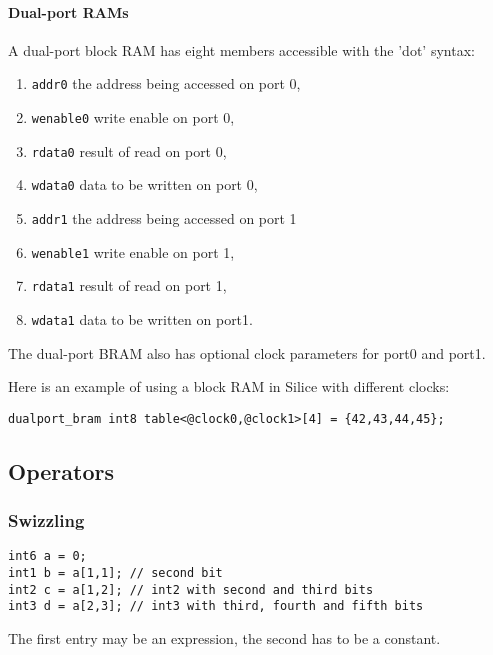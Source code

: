 \documentclass[a4]{article}
\newcommand\silice{Silice}
\begin{document}
\paragraph{Dual-port RAMs}

A dual-port block RAM has eight members accessible with the 'dot' syntax: 
\begin{enumerate}
	\item {\tt addr0} the address being accessed on port 0,
	\item {\tt wenable0} write enable on port 0,
	\item {\tt rdata0} result of read on port 0,
	\item {\tt wdata0} data to be written on port 0,
	\item {\tt addr1} the address being accessed on port 1
	\item {\tt wenable1} write enable on port 1,
	\item {\tt rdata1} result of read on port 1,
	\item {\tt wdata1} data to be written on port1.
\end{enumerate}

The dual-port BRAM also has optional clock parameters for port0 and port1.

Here is an example of using a block RAM in \silice{} with different clocks:

\begin{verbatim}
dualport_bram int8 table<@clock0,@clock1>[4] = {42,43,44,45};
\end{verbatim}


\subsection{Operators}

\subsubsection{Swizzling}

\begin{verbatim}
int6 a = 0;
int1 b = a[1,1]; // second bit
int2 c = a[1,2]; // int2 with second and third bits
int3 d = a[2,3]; // int3 with third, fourth and fifth bits
\end{verbatim}

The first entry may be an expression, the second has to be a constant.
\end{document}
